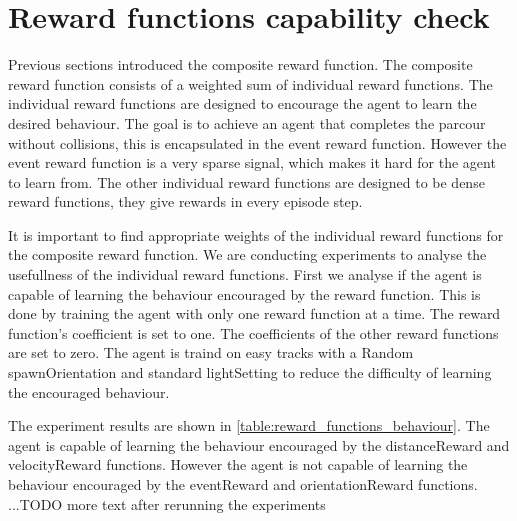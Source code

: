 

\section{Reward functions capability check}

Previous sections introduced the composite reward function. The composite reward function consists of a weighted sum of individual reward functions. The individual reward functions are designed to encourage the agent to learn the desired behaviour. The goal is to achieve an agent that completes the parcour without collisions, this is encapsulated in the event reward function. However the event reward function is a very sparse signal, which makes it hard for the agent to learn from. The other individual reward functions are designed to be dense reward functions, they give rewards in every episode step.

It is important to find appropriate weights of the individual reward functions for the composite reward function. We are conducting experiments to analyse the usefullness of the individual reward functions. First we analyse if the agent is capable of learning the behaviour encouraged by the reward function.
This is done by training the agent with only one reward function at a time. The reward function's coefficient is set to one. The coefficients of the other reward functions are set to zero. The agent is traind on easy tracks with a Random spawnOrientation and standard lightSetting to reduce the difficulty of learning the encouraged behaviour.


The experiment results are shown in \ref{table:reward_functions_behaviour}. The agent is capable of learning the behaviour encouraged by the distanceReward and velocityReward functions. However the agent is not capable of learning the behaviour encouraged by the eventReward and orientationReward functions. 
...TODO more text after rerunning the experiments


